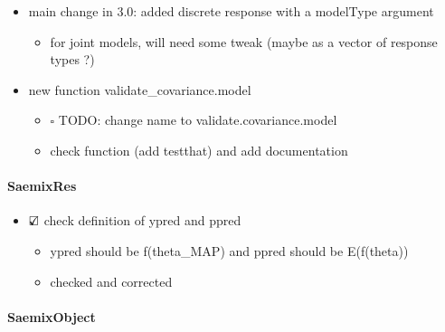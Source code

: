 \documentclass[
]{article}
\providecommand{\tightlist}{%
  \setlength{\itemsep}{0pt}\setlength{\parskip}{0pt}}
\begin{document}
\begin{itemize}
\tightlist
\item
  main change in 3.0: added discrete response with a modelType argument

  \begin{itemize}
  \tightlist
  \item
    for joint models, will need some tweak (maybe as a vector of
    response types ?)
  \end{itemize}
\item
  new function validate\_covariance.model

  \begin{itemize}
  \tightlist
  \item
    \(\square\) TODO: change name to validate.covariance.model
  \item
    check function (add testthat) and add documentation
  \end{itemize}
\end{itemize}

\hypertarget{saemixres}{%
\paragraph{SaemixRes}\label{saemixres}}

\begin{itemize}
\tightlist
\item
  \(\text{\rlap{$\checkmark$}}\square\) check definition of ypred and
  ppred

  \begin{itemize}
  \tightlist
  \item
    ypred should be f(theta\_MAP) and ppred should be E(f(theta))
  \item
    checked and corrected
  \end{itemize}
\end{itemize}

\hypertarget{saemixobject}{%
\paragraph{SaemixObject}\label{saemixobject}}
\end{document}
